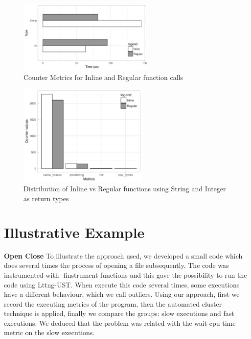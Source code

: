     \begin{figure}[h]
      \centering
        \includegraphics[width=0.6\textwidth]{figures/bar-inline-vs-regular.png}
        \caption{Counter Metrics for Inline and Regular function calls}
        \label{fig:notinline}
    \end{figure}
    
    \begin{figure}[h]
      \centering
        \includegraphics[width=0.57\textwidth]{figures/barplots-inline-vs-regular-counters.png}
        \caption{Distribution of Inline vs Regular functions using String and Integer as return types}
        \label{fig:inline}
    \end{figure}
    
    
    \section{Illustrative Example}
    
\textbf{Open Close}
    To illustrate the approach used, we developed a small code which does several times the process of opening a file subsequently. The code was instrumented with -finstrument functions and this gave the possibility to run the code using Lttng-UST.
    When execute this code several times, some executions have a different behaviour, which we call outliers.
    Using our approach, first we record the executing metrics of the program, then the automated cluster technique is applied, finally we compare the groups: slow executions and fast executions. We deduced that the problem was related with the wait-cpu time metric on the slow executions.
    
